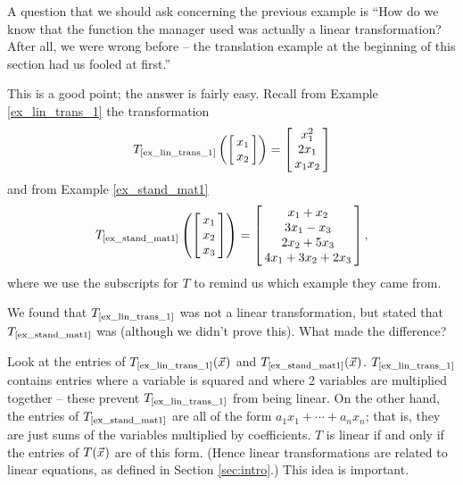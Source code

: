 A question that we should ask concerning the previous example is ``How do we know that the function the manager used was actually a linear transformation? After all, we were wrong before -- the translation example at the beginning of this section had us fooled at first.''

This is a good point; the answer is fairly easy. Recall from Example \ref{ex_lin_trans_1} the transformation $$T_{\text{\scriptsize {\ref{ex_lin_trans_1}}}}\left(\bmx{c}x_1\\x_2\emx\right) = \bmx{c}x_1^2\\2x_1\\x_1x_2\emx$$ and from Example \ref{ex_stand_mat1}$$T_{\text{\scriptsize \ref{ex_stand_mat1}}}\left(\bmx{c} x_1\\x_2\\x_3\emx\right) = \bmx{c} x_1+x_2\\ 3x_1-x_3 \\ 2x_2+5x_3 \\ 4x_1+3x_2+2x_3\emx,$$ where we use the subscripts for $T$ to remind us which example they came from.

We found that $T_{\text{\scriptsize\ref{ex_lin_trans_1}}}$ was not a linear transformation, but stated that $T_{\text{\scriptsize\ref{ex_stand_mat1}}}$ was (although we didn't prove this). What made the difference? 

Look at the entries of $T_{\text{\scriptsize\ref{ex_lin_trans_1}}}(\vx)$ and $T_{\text{\scriptsize\ref{ex_stand_mat1}}}(\vx)$. $T_{\text{\scriptsize\ref{ex_lin_trans_1}}}$ contains entries where a variable is squared and where 2 variables are multiplied together -- these prevent $T_{\text{\scriptsize\ref{ex_lin_trans_1}}}$ from being linear. On the other hand, the entries of $T_{\text{\scriptsize\ref{ex_stand_mat1}}}$ are all of the form $a_1x_1 + \cdots + a_nx_n$; that is, they are just sums of the variables multiplied by coefficients. $T$ is linear if and only if the entries of $T(\vx)$ are of this form. (Hence linear transformations are related to linear equations, as defined in Section \ref{sec:intro}.) This idea is important.


